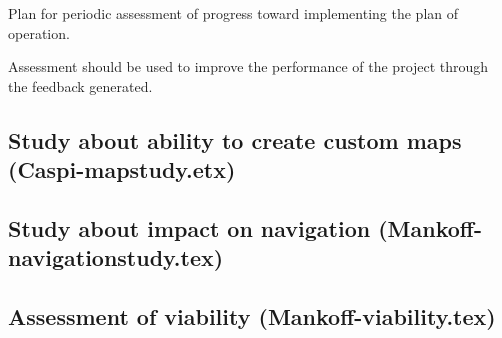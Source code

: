 Plan for periodic assessment of progress toward implementing the plan of operation.

Assessment should be used to improve the performance of the project through the feedback generated.
\subsection{Study about ability to create custom maps (Caspi-mapstudy.etx)}


\subsection{Study about impact on navigation (Mankoff-navigationstudy.tex)}


\subsection{Assessment of viability (Mankoff-viability.tex)}

